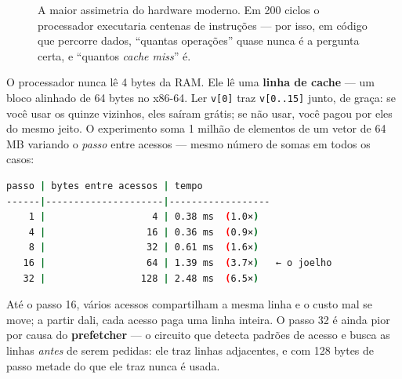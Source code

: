 \begin{figure}[htbp]
\centering
{}
\caption{A maior assimetria do hardware moderno. Em 200 ciclos o processador
         executaria centenas de instruções --- por isso, em código que percorre
         dados, ``quantas operações'' quase nunca é a pergunta certa, e ``quantos
         \emph{cache miss}'' é.}
\label{fig:hierarquia}
\end{figure}

O processador nunca lê 4 bytes da RAM. Ele lê uma \textbf{linha de cache} --- um
bloco alinhado de 64 bytes no x86-64. Ler \texttt{v[0]} traz \texttt{v[0..15]}
junto, de graça: se você usar os quinze vizinhos, eles saíram grátis; se não usar,
você pagou por eles do mesmo jeito. O experimento soma 1 milhão de elementos de um
vetor de 64\,MB variando o \emph{passo} entre acessos --- mesmo número de somas em
todos os casos:

\begin{lstlisting}[style=bt, language=bash,
    caption={Saída de \texttt{src/performance/}: o joelho está exatamente em
             $64 / \texttt{sizeof(int)}$.}]
passo | bytes entre acessos | tempo
------|---------------------|------------------
    1 |                   4 | 0.38 ms  (1.0×)
    4 |                  16 | 0.36 ms  (0.9×)
    8 |                  32 | 0.61 ms  (1.6×)
   16 |                  64 | 1.39 ms  (3.7×)   ← o joelho
   32 |                 128 | 2.48 ms  (6.5×)
\end{lstlisting}

Até o passo 16, vários acessos compartilham a mesma linha e o custo mal se move; a
partir dali, cada acesso paga uma linha inteira. O passo 32 é ainda pior por causa
do \textbf{prefetcher} --- o circuito que detecta padrões de acesso e busca as
linhas \emph{antes} de serem pedidas: ele traz linhas adjacentes, e com 128 bytes
de passo metade do que ele traz nunca é usada.

